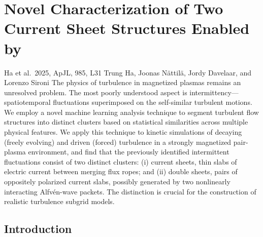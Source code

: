 \section{Novel Characterization of Two Current Sheet Structures Enabled by \awesom}

\publicationdetails
{Ha et al.\ 2025, ApJL, 985, L31}
{Trung Ha\footnotemark[1]\footnotemark[2]\footnotemark[3], Joonas Nättilä\footnotemark[4]\footnotemark[2]\footnotemark[5], Jordy Davelaar\footnotemark[6]\footnotemark[2]\footnotemark[5]\footnotemark[7], and Lorenzo Sironi\footnotemark[8]\footnotemark[2]}
{The physics of turbulence in magnetized plasmas remains an unresolved problem. The most poorly understood aspect is intermittency---spatiotemporal fluctuations superimposed on the self-similar turbulent motions. We employ a novel machine learning analysis technique to segment turbulent flow structures into distinct clusters based on statistical similarities across multiple physical features. We apply this technique to kinetic simulations of decaying (freely evolving) and driven (forced) turbulence in a strongly magnetized pair-plasma environment, and find that the previously identified intermittent fluctuations consist of two distinct clusters: (i) current sheets, thin slabs of electric current between merging flux ropes; and (ii) double sheets, pairs of oppositely polarized current slabs, possibly generated by two nonlinearly interacting Alfvén-wave packets. The distinction is crucial for the construction of realistic turbulence subgrid models.}
{
}
\setcounter{footnote}{0}

\subsection{Introduction} \label{sec:plasma-intro}

